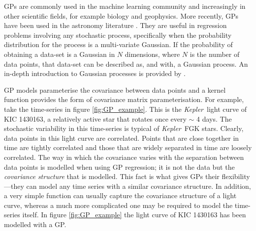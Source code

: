 \documentclass[useAMS, usenatbib, preprint, 12pt]{aastex}
\newcommand{\Kepler}{{\it Kepler}}
\newcommand{\kepler}{\Kepler}
\newcommand{\eg}{{\it e.g.}}
\begin{document}
GPs are commonly used in the machine learning community and increasingly
in other scientific fields, for example biology and geophysics.
More recently, GPs have been used in the astronomy literature \citep[see
\eg][]{Gibson2012, Haywood2014, Haywood2015, Evans2015, Rajpaul2015,
Rajpaul2016, Aigrain2016}.
They are useful in regression problems involving any stochastic process,
specifically when the probability distribution for the process is a
multi-variate Gaussian.
If the probability of obtaining a data-set is a Gaussian in $N$ dimensions,
where $N$ is the number of data points, that data-set can be described as, and
with, a Gaussian process.
An in-depth introduction to Gaussian processes is provided by
\citet{Rasmussen2005}.

GP models parameterise the covariance between data points and a kernel
function provides the form of covariance matrix parameterisation.
For example, take the time-series in figure \ref{fig:GP_example}.
This is the \kepler\ light curve of KIC 1430163, a relatively active star that
rotates once every $\sim$ 4 days.
The stochastic variability in this time-series is typical of \kepler\ FGK
stars.
Clearly, data points in this light curve are correlated.
Points that are close together in time are tightly correlated and those that
are widely separated in time are loosely correlated.
The way in which the covariance varies with the separation between data points
is modelled when using GP regression; it is not the data but the {\it
covariance structure} that is modelled.
This fact is what gives GPs their flexibility---they can model any time
series with a similar covariance structure.
In addition, a very simple function can usually capture the covariance
structure of a light curve, whereas a much more complicated one may be
required to model the time-series itself.
In figure \ref{fig:GP_example} the light curve of KIC 1430163 has been
modelled with a GP.
\end{document}

